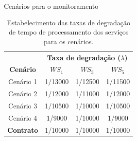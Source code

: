 \documentclass[xcolor=svgnames]{beamer}
\newcommand {\otoprule}{\midrule [\heavyrulewidth]}  %
\begin{document}
  \begin{frame}{Cenários para o monitoramento}
    \begin{center}
      \begin{table}[h]
	  \centering
	\caption{ Estabelecimento das taxas de degradação de tempo de processamento dos serviços para os cenários.  }
	\begin{center}
	  \begin{tabular}{ cccc}
	    \toprule
			&   \multicolumn{3}{c}{ \textbf{Taxa de degradação ($\lambda$)} } \\
	    \textbf{Cenário}    &    $WS_1$	  &	  $WS_3$ 	& 	 $WS_5$ \\
	    \cmidrule[1pt](r){1-1} \cmidrule[1pt](l){2-4}
	    
	    Cenário 1 &		\cellcolor{red!25} 1/13000  	 & 	\cellcolor{red!25} 1/12500		&	\cellcolor{red!25} 1/11500	\\
	    Cenário 2 &		\cellcolor{red!25} 1/12000  	 & 	\cellcolor{red!25} 1/11000		&	\cellcolor{red!25} 1/12000	\\
	    \midrule
	    Cenário 3 &		\cellcolor{green!25} 1/10500  	 & 	\cellcolor{green!25} 1/10000		&	\cellcolor{green!25} 1/10500	\\
	    Cenário 4 &		\cellcolor{green!25} 1/9000  	 & 	\cellcolor{green!25} 1/10000		&	\cellcolor{green!25} 1/9000	\\
	    \cmidrule[1pt](r){1-1} \cmidrule[1pt](l){2-4}
	    \textbf{Contrato}  &	\cellcolor{yellow!49} 1/10000		&	\cellcolor{yellow!49} 1/10000		&	\cellcolor{yellow!49} 1/10000 \\
	    \bottomrule
      
	  \end{tabular}
	  \label{table:scenarios_rates}
	  \end{center}
      \end{table}
    \end{center}
  \end{frame}
\end{document}
